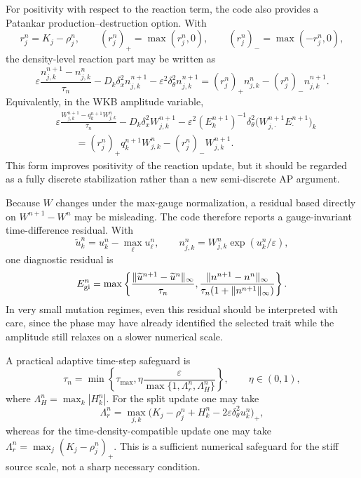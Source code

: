 \documentclass[11pt]{article}
\begin{document}
{For positivity with respect to the reaction term, the code also provides a Patankar production--destruction option. With
\[
    r_j^n=K_j-\rho_j^n,
    \qquad
    (r_j^n)_+=\max(r_j^n,0),
    \qquad
    (r_j^n)_-=\max(-r_j^n,0),
\]
the density-level reaction part may be written as
\begin{equation}\label{eq:density_patankar_new}
    \varepsilon\frac{n_{j,k}^{n+1}-n_{j,k}^n}{\tau_n}
    -D_k\delta_x^2n_{j,k}^{n+1}
    -\varepsilon^2\delta_\theta^2n_{j,k}^{n+1}
    =(r_j^n)_+n_{j,k}^n-(r_j^n)_-n_{j,k}^{n+1}.
\end{equation}
Equivalently, in the WKB amplitude variable,
\begin{equation}\label{eq:w_patankar_new}
\begin{aligned}
    &\varepsilon\frac{W_{j,k}^{n+1}-q_k^{n+1}W_{j,k}^n}{\tau_n}
    -D_k\delta_x^2W_{j,k}^{n+1}
    -\varepsilon^2(E_k^{n+1})^{-1}
      \delta_\theta^2\bigl(W_{j,\cdot}^{n+1}E_{\cdot}^{n+1}\bigr)_k \\
    &\qquad=(r_j^n)_+q_k^{n+1}W_{j,k}^n-(r_j^n)_-W_{j,k}^{n+1}.
\end{aligned}
\end{equation}
This form improves positivity of the reaction update, but it should be regarded as a fully discrete stabilization rather than a new semi-discrete AP argument.

Because \(W\) changes under the max-gauge normalization, a residual based directly on \(W^{n+1}-W^n\) may be misleading. The code therefore reports a gauge-invariant time-difference residual. With
\[
    \widetilde u_k^n=u_k^n-\max_\ell u_\ell^n,
    \qquad
    n^n_{j,k}=W^n_{j,k}\exp(u^n_k/\varepsilon),
\]
one diagnostic residual is
\begin{equation}\label{eq:stationary_residual_new}
    E^n_{\rm gi}=\max\left\{
    \frac{\|\widetilde u^{n+1}-\widetilde u^n\|_\infty}{\tau_n},
    \frac{\|n^{n+1}-n^n\|_\infty}{\tau_n(1+\|n^{n+1}\|_\infty)}
    \right\}.
\end{equation}
In very small mutation regimes, even this residual should be interpreted with care, since the phase may have already identified the selected trait while the amplitude still relaxes on a slower numerical scale.

A practical adaptive time-step safeguard is
\begin{equation}\label{eq:adaptive_dt_new}
    \tau_n
    =\min\left\{\tau_{\max},
    \eta\frac{\varepsilon}{\max\{1,\Lambda_r^n,\Lambda_H^n\}}\right\},
    \qquad
    \eta\in(0,1),
\end{equation}
where \(\Lambda_H^n=\max_k |H_k^n|\). For the split update one may take
\[
    \Lambda_r^n=\max_{j,k}\bigl(K_j-\rho_j^n+H_k^n-2\varepsilon\delta_\theta^2u_k^n\bigr)_+,
\]
whereas for the time-density-compatible update one may take \(\Lambda_r^n=\max_j(K_j-\rho_j^n)_+\). This is a sufficient numerical safeguard for the stiff source scale, not a sharp necessary condition.

}
\end{document}
